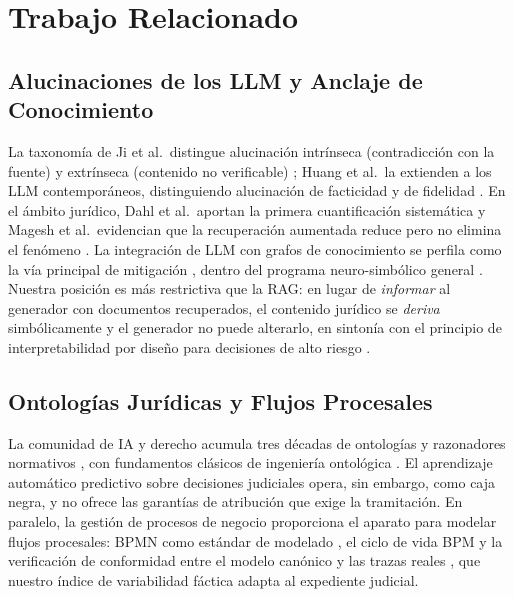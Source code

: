 \documentclass[computers,article,submit,pdftex,moreauthors]{Definitions/mdpi}
\begin{document}
\section{Trabajo Relacionado}
\label{sec:related}

\subsection{Alucinaciones de los LLM y Anclaje de Conocimiento}
La taxonomía de Ji et al.\ distingue alucinación intrínseca (contradicción con la fuente) y extrínseca (contenido no verificable) \cite{Ji2023}; Huang et al.\ la extienden a los LLM contemporáneos, distinguiendo alucinación de facticidad y de fidelidad \cite{Huang2025}. En el ámbito jurídico, Dahl et al.\ aportan la primera cuantificación sistemática \cite{Dahl2024} y Magesh et al.\ evidencian que la recuperación aumentada reduce pero no elimina el fenómeno \cite{Magesh2025}. La integración de LLM con grafos de conocimiento se perfila como la vía principal de mitigación \cite{Pan2024,Hogan2021}, dentro del programa neuro-simbólico general \cite{Sarker2021}. Nuestra posición es más restrictiva que la RAG: en lugar de \emph{informar} al generador con documentos recuperados, el contenido jurídico se \emph{deriva} simbólicamente y el generador no puede alterarlo, en sintonía con el principio de interpretabilidad por diseño para decisiones de alto riesgo \cite{Rudin2019,BarredoArrieta2020}.

\subsection{Ontologías Jurídicas y Flujos Procesales}
La comunidad de IA y derecho acumula tres décadas de ontologías y razonadores normativos \cite{BenchCapon2012,Casanovas2016}, con fundamentos clásicos de ingeniería ontológica \cite{Gruber1993,Uschold1996}. El aprendizaje automático predictivo sobre decisiones judiciales \cite{Katz2017,Medvedeva2020} opera, sin embargo, como caja negra, y no ofrece las garantías de atribución que exige la tramitación. En paralelo, la gestión de procesos de negocio proporciona el aparato para modelar flujos procesales: BPMN como estándar de modelado \cite{Chinosi2012}, el ciclo de vida BPM \cite{Aalst2013} y la verificación de conformidad entre el modelo canónico y las trazas reales \cite{Rozinat2008}, que nuestro índice de variabilidad fáctica adapta al expediente judicial.
\end{document}
